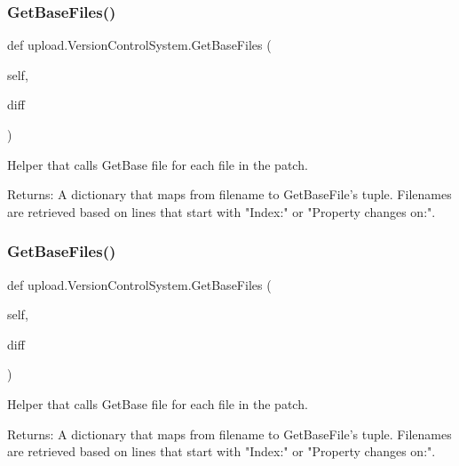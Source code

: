 \mbox{\label{classupload_1_1_version_control_system_a812c3b3daf90c88b015fa4b26252e291}} 
\subsubsection{\texorpdfstring{GetBaseFiles()}{GetBaseFiles()}\hspace{0.1cm}{\footnotesize\ttfamily [1/2]}}
{\footnotesize\ttfamily def upload.\+Version\+Control\+System.\+Get\+Base\+Files (\begin{DoxyParamCaption}\item[{}]{self,  }\item[{}]{diff }\end{DoxyParamCaption})}

\begin{DoxyVerb}Helper that calls GetBase file for each file in the patch.

Returns:
  A dictionary that maps from filename to GetBaseFile's tuple.  Filenames
  are retrieved based on lines that start with "Index:" or
  "Property changes on:".
\end{DoxyVerb}
 \mbox{\label{classupload_1_1_version_control_system_a812c3b3daf90c88b015fa4b26252e291}} 
\subsubsection{\texorpdfstring{GetBaseFiles()}{GetBaseFiles()}\hspace{0.1cm}{\footnotesize\ttfamily [2/2]}}
{\footnotesize\ttfamily def upload.\+Version\+Control\+System.\+Get\+Base\+Files (\begin{DoxyParamCaption}\item[{}]{self,  }\item[{}]{diff }\end{DoxyParamCaption})}

\begin{DoxyVerb}Helper that calls GetBase file for each file in the patch.

Returns:
  A dictionary that maps from filename to GetBaseFile's tuple.  Filenames
  are retrieved based on lines that start with "Index:" or
  "Property changes on:".
\end{DoxyVerb}
 \mbox{\label{classupload_1_1_version_control_system_a56a60e56aa9aff3df4001d2f84cab884}} 

